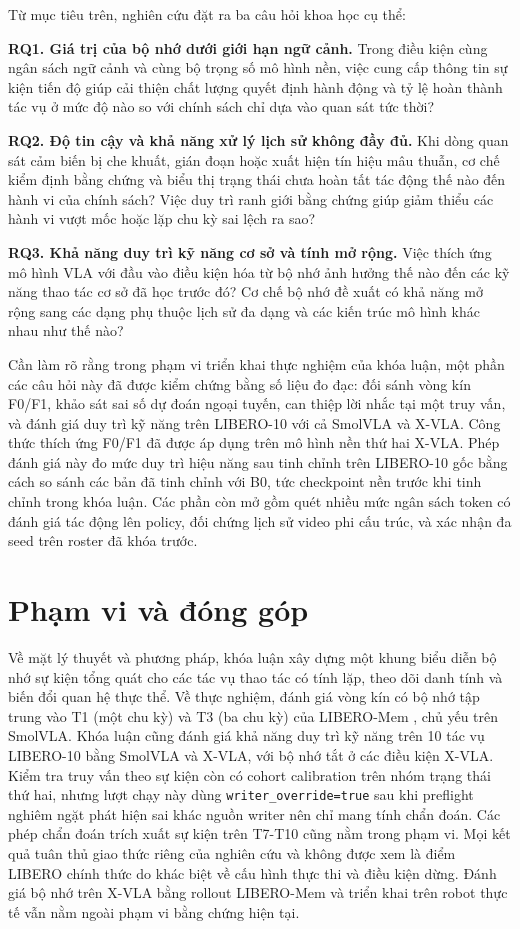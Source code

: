 Từ mục tiêu trên, nghiên cứu đặt ra ba câu hỏi khoa học cụ thể:

\textbf{RQ1. Giá trị của bộ nhớ dưới giới hạn ngữ cảnh.} Trong điều kiện cùng ngân sách ngữ cảnh và cùng bộ trọng số mô hình nền, việc cung cấp thông tin sự kiện tiến độ giúp cải thiện chất lượng quyết định hành động và tỷ lệ hoàn thành tác vụ ở mức độ nào so với chính sách chỉ dựa vào quan sát tức thời?

\textbf{RQ2. Độ tin cậy và khả năng xử lý lịch sử không đầy đủ.} Khi dòng quan sát cảm biến bị che khuất, gián đoạn hoặc xuất hiện tín hiệu mâu thuẫn, cơ chế kiểm định bằng chứng và biểu thị trạng thái chưa hoàn tất tác động thế nào đến hành vi của chính sách? Việc duy trì ranh giới bằng chứng giúp giảm thiểu các hành vi vượt mốc hoặc lặp chu kỳ sai lệch ra sao?

\textbf{RQ3. Khả năng duy trì kỹ năng cơ sở và tính mở rộng.} Việc thích ứng mô hình VLA với đầu vào điều kiện hóa từ bộ nhớ ảnh hưởng thế nào đến các kỹ năng thao tác cơ sở đã học trước đó? Cơ chế bộ nhớ đề xuất có khả năng mở rộng sang các dạng phụ thuộc lịch sử đa dạng và các kiến trúc mô hình khác nhau như thế nào?

Cần làm rõ rằng trong phạm vi triển khai thực nghiệm của khóa luận, một phần các câu hỏi này đã được kiểm chứng bằng số liệu đo đạc: đối sánh vòng kín F0/F1, khảo sát sai số dự đoán ngoại tuyến, can thiệp lời nhắc tại một truy vấn, và đánh giá duy trì kỹ năng trên LIBERO-10 với cả SmolVLA và X-VLA. Công thức thích ứng F0/F1 đã được áp dụng trên mô hình nền thứ hai X-VLA. Phép đánh giá này đo mức duy trì hiệu năng sau tinh chỉnh trên LIBERO-10 gốc bằng cách so sánh các bản đã tinh chỉnh với B0, tức checkpoint nền trước khi tinh chỉnh trong khóa luận. Các phần còn mở gồm quét nhiều mức ngân sách token có đánh giá tác động lên policy, đối chứng lịch sử video phi cấu trúc, và xác nhận đa seed trên roster đã khóa trước.

\section{Phạm vi và đóng góp}

Về mặt lý thuyết và phương pháp, khóa luận xây dựng một khung biểu diễn bộ nhớ sự kiện tổng quát cho các tác vụ thao tác có tính lặp, theo dõi danh tính và biến đổi quan hệ thực thể. Về thực nghiệm, đánh giá vòng kín có bộ nhớ tập trung vào T1 (một chu kỳ) và T3 (ba chu kỳ) của LIBERO-Mem \cite{liberomemSource}, chủ yếu trên SmolVLA. Khóa luận cũng đánh giá khả năng duy trì kỹ năng trên 10 tác vụ LIBERO-10 \cite{liberoSource} bằng SmolVLA và X-VLA, với bộ nhớ tắt ở các điều kiện X-VLA. Kiểm tra truy vấn theo sự kiện còn có cohort calibration trên nhóm trạng thái thứ hai, nhưng lượt chạy này dùng \texttt{writer\_override=true} sau khi preflight nghiêm ngặt phát hiện sai khác nguồn writer nên chỉ mang tính chẩn đoán. Các phép chẩn đoán trích xuất sự kiện trên T7-T10 cũng nằm trong phạm vi. Mọi kết quả tuân thủ giao thức riêng của nghiên cứu và không được xem là điểm LIBERO chính thức do khác biệt về cấu hình thực thi và điều kiện dừng. Đánh giá bộ nhớ trên X-VLA bằng rollout LIBERO-Mem và triển khai trên robot thực tế vẫn nằm ngoài phạm vi bằng chứng hiện tại.


